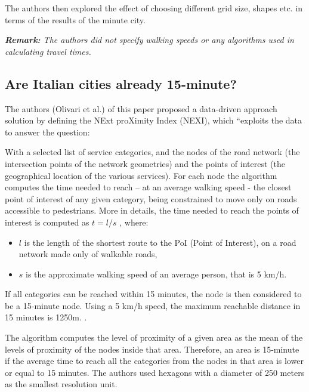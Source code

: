 The authors then explored the effect of choosing different grid size, shapes etc. in terms of the results of the minute city.

\textit{\textbf{Remark:} The authors did not specify walking speeds or any algorithms used in calculating travel times.}

\subsection{Are Italian cities already 15-minute?} \label{olivari_are_2023}

The authors (Olivari et al.) of this paper proposed a data-driven approach solution by defining the NExt proXimity Index (NEXI), which “exploits the data to answer the question:  \cite{olivari_are_2023}

With a selected list of service categories, and the nodes of the road network (the intersection points of the network geometries) and the points of interest (the geographical location of the various services). For each node the algorithm computes the time needed to reach – at an average walking speed - the closest point of interest of any given category, being constrained to move only on roads accessible to pedestrians. More in details, the time needed to reach the points of interest is computed as $t = l / s$ , where:

\begin{itemize}
\item $l$ is the length of the shortest route to the PoI (Point of Interest), on a road network made only of walkable roads,
\item $s$ is the approximate walking speed of an average person, that is 5 km/h.
\end{itemize}

If all categories can be reached within 15 minutes, the node is then considered to be a 15-minute node. Using a 5 km/h speed, the maximum reachable distance in 15 minutes is 1250m. .

The algorithm computes the level of proximity of a given area as the mean of the levels of proximity of the nodes inside that area. Therefore, an area is 15-minute if the average time to reach all the categories from the nodes in that area is lower or equal to 15 minutes. The authors used hexagons with a diameter of 250 meters as the smallest resolution unit.

